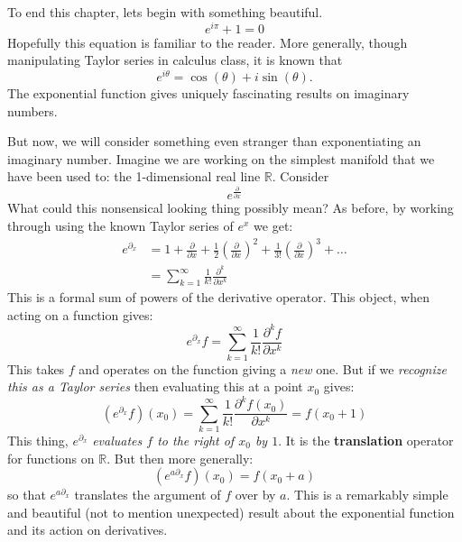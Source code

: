 \documentclass[../master.tex]{subfiles}
\begin{document}
		To end this chapter, lets begin with something beautiful. 
		\begin{equation*}
			e^{i \pi} + 1 = 0
		\end{equation*}
		Hopefully this equation is familiar to the reader. More generally, though manipulating Taylor series in calculus class, it is known that
		\begin{equation}
			e^{i \theta} = \cos(\theta) + i \sin(\theta).
		\end{equation}
		The exponential function gives uniquely fascinating results on imaginary numbers.
		
		But now, we will consider something even stranger than exponentiating an imaginary number. Imagine we are working on the simplest manifold that we have been used to: the 1-dimensional real line $\mathbb R$. Consider
		\begin{equation*}
			e^{\frac{\partial}{\partial x}}
		\end{equation*}
		What could this nonsensical looking thing possibly mean? As before, by working through using the known Taylor series of $e^x$ we get:
		\begin{align}
			e^{\partial_x} &= 1 + \frac{\partial}{\partial x} + \frac{1}{2} \left( \frac{\partial}{\partial x} \right)^2 + \frac{1}{3!} \left( \frac{\partial}{\partial x} \right)^3 + \dots\\
			&= \sum_{k=1}^\infty \frac{1}{k!} \frac{\partial^k}{\partial x^k}
		\end{align}
		This is a formal sum of powers of the derivative operator. This object, when acting on a function gives:
		\begin{equation}
			e^{\partial_x} f = \sum_{k=1}^\infty \frac{1}{k!} \frac{\partial^k f}{\partial x^k}
		\end{equation} 
		This takes $f$ and operates on the function giving a \emph{new} one. But if we \emph{recognize this as a Taylor series} then evaluating this at a point $x_0$ gives:
		\begin{equation}
			(e^{\partial_x} f)(x_0) = \sum_{k=1}^\infty \frac{1}{k!} \frac{\partial^k f (x_0)}{\partial x^k} = f(x_0 + 1)
		\end{equation}
		This thing, $e^{\partial_x}$ \emph{evaluates $f$ to the right of $x_0$ by $1$}. It is the \textbf{translation} operator for functions on $\mathbb R$. But then more generally: 
		\begin{equation}
			(e^{a \partial_x} f) (x_0) = f(x_0 + a)
		\end{equation}
		so that $e^{a \partial_x}$ translates the argument of $f$ over by $a$. This is a remarkably simple and beautiful (not to mention unexpected) result about the exponential function and its action on derivatives.
		
\end{document}
